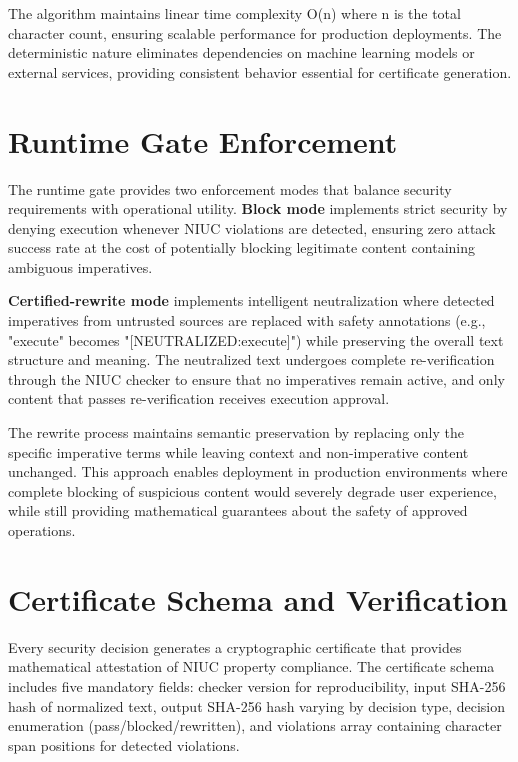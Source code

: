 The algorithm maintains linear time complexity O(n) where n is the total character count, ensuring scalable performance for production deployments. The deterministic nature eliminates dependencies on machine learning models or external services, providing consistent behavior essential for certificate generation.

\section{Runtime Gate Enforcement}

The runtime gate provides two enforcement modes that balance security requirements with operational utility. \textbf{Block mode} implements strict security by denying execution whenever NIUC violations are detected, ensuring zero attack success rate at the cost of potentially blocking legitimate content containing ambiguous imperatives.

\textbf{Certified-rewrite mode} implements intelligent neutralization where detected imperatives from untrusted sources are replaced with safety annotations (e.g., "execute" becomes "[NEUTRALIZED:execute]") while preserving the overall text structure and meaning. The neutralized text undergoes complete re-verification through the NIUC checker to ensure that no imperatives remain active, and only content that passes re-verification receives execution approval.

The rewrite process maintains semantic preservation by replacing only the specific imperative terms while leaving context and non-imperative content unchanged. This approach enables deployment in production environments where complete blocking of suspicious content would severely degrade user experience, while still providing mathematical guarantees about the safety of approved operations.

\section{Certificate Schema and Verification}

Every security decision generates a cryptographic certificate that provides mathematical attestation of NIUC property compliance. The certificate schema includes five mandatory fields: checker version for reproducibility, input SHA-256 hash of normalized text, output SHA-256 hash varying by decision type, decision enumeration (pass/blocked/rewritten), and violations array containing character span positions for detected violations.

